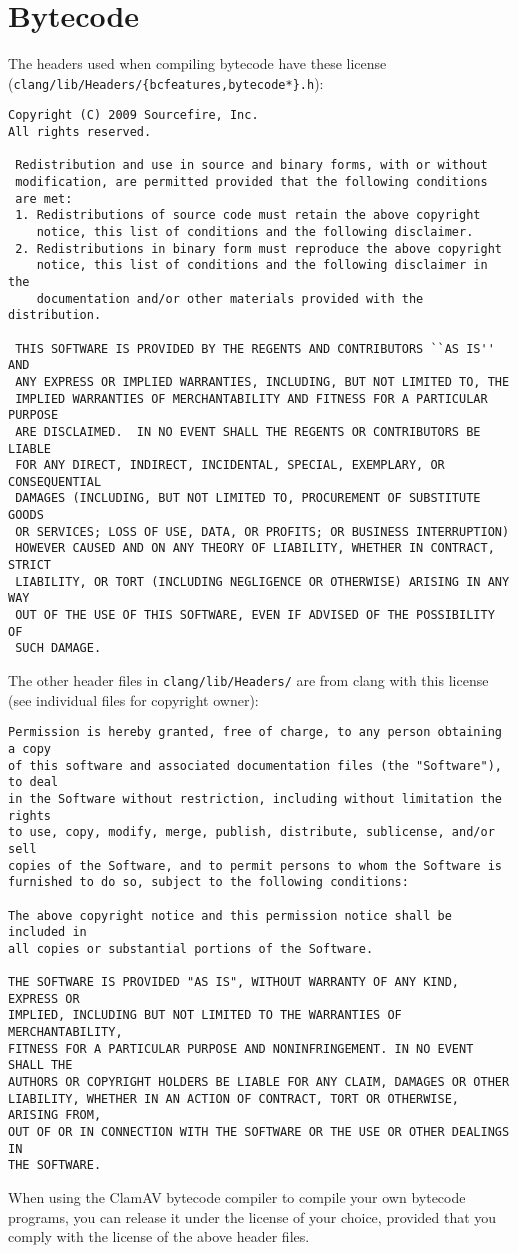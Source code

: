 \section{Bytecode}
The headers used when compiling bytecode have these license (\verb+clang/lib/Headers/{bcfeatures,bytecode*}.h+):
{\footnotesize
\begin{verbatim}
Copyright (C) 2009 Sourcefire, Inc.
All rights reserved.

 Redistribution and use in source and binary forms, with or without
 modification, are permitted provided that the following conditions
 are met:
 1. Redistributions of source code must retain the above copyright
    notice, this list of conditions and the following disclaimer.
 2. Redistributions in binary form must reproduce the above copyright
    notice, this list of conditions and the following disclaimer in the
    documentation and/or other materials provided with the distribution.
 
 THIS SOFTWARE IS PROVIDED BY THE REGENTS AND CONTRIBUTORS ``AS IS'' AND
 ANY EXPRESS OR IMPLIED WARRANTIES, INCLUDING, BUT NOT LIMITED TO, THE
 IMPLIED WARRANTIES OF MERCHANTABILITY AND FITNESS FOR A PARTICULAR PURPOSE
 ARE DISCLAIMED.  IN NO EVENT SHALL THE REGENTS OR CONTRIBUTORS BE LIABLE
 FOR ANY DIRECT, INDIRECT, INCIDENTAL, SPECIAL, EXEMPLARY, OR CONSEQUENTIAL
 DAMAGES (INCLUDING, BUT NOT LIMITED TO, PROCUREMENT OF SUBSTITUTE GOODS
 OR SERVICES; LOSS OF USE, DATA, OR PROFITS; OR BUSINESS INTERRUPTION)
 HOWEVER CAUSED AND ON ANY THEORY OF LIABILITY, WHETHER IN CONTRACT, STRICT
 LIABILITY, OR TORT (INCLUDING NEGLIGENCE OR OTHERWISE) ARISING IN ANY WAY
 OUT OF THE USE OF THIS SOFTWARE, EVEN IF ADVISED OF THE POSSIBILITY OF
 SUCH DAMAGE.
\end{verbatim}
}

The other header files in \verb+clang/lib/Headers/+ are from clang with this license
(see individual files for copyright owner):
{\footnotesize
\begin{verbatim}
Permission is hereby granted, free of charge, to any person obtaining a copy
of this software and associated documentation files (the "Software"), to deal
in the Software without restriction, including without limitation the rights
to use, copy, modify, merge, publish, distribute, sublicense, and/or sell
copies of the Software, and to permit persons to whom the Software is
furnished to do so, subject to the following conditions:

The above copyright notice and this permission notice shall be included in
all copies or substantial portions of the Software.

THE SOFTWARE IS PROVIDED "AS IS", WITHOUT WARRANTY OF ANY KIND, EXPRESS OR
IMPLIED, INCLUDING BUT NOT LIMITED TO THE WARRANTIES OF MERCHANTABILITY,
FITNESS FOR A PARTICULAR PURPOSE AND NONINFRINGEMENT. IN NO EVENT SHALL THE
AUTHORS OR COPYRIGHT HOLDERS BE LIABLE FOR ANY CLAIM, DAMAGES OR OTHER
LIABILITY, WHETHER IN AN ACTION OF CONTRACT, TORT OR OTHERWISE, ARISING FROM,
OUT OF OR IN CONNECTION WITH THE SOFTWARE OR THE USE OR OTHER DEALINGS IN
THE SOFTWARE.
\end{verbatim}
}

When using the ClamAV bytecode compiler to compile your own bytecode programs, you can release it under the license of your choice,
provided that you comply with the license of the above header files.


